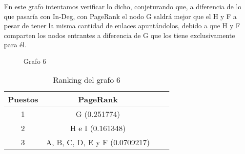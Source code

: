 En este grafo intentamos verificar lo dicho, conjeturando que, a diferencia de lo que pasaría con In-Deg, con PageRank el nodo G saldrá mejor que el H y F a pesar de tener la misma cantidad de enlaces apuntándolos, debido a que H y F comparten los nodos entrantes a diferencia de G que los tiene exclusivamente para él.
\begin{figure}[H]
\centering
{}
  \caption{\footnotesize{ Grafo 6 }}
  \label{fig:Rankings}
\end{figure}

\begin{table}[H]
\centering
\begin{tabular}{| c | c | c | c |}
  \hline
  \rowcolor{LightCyan}
  Puestos & PageRank\\ \hline \hline
  1 & G (0.251774)\\ \hline
  2 & H e I (0.161348)\\ \hline
  3 & A, B, C, D, E y F (0.0709217)\\ \hline
\end{tabular}
  \caption{\footnotesize{Ranking del grafo 6}}
  \label{tab:Rankings7}
\end{table}

